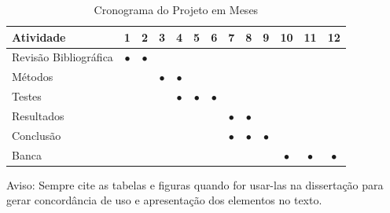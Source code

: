 \documentclass[
	12pt,				    %
	openright,			    %
	oneside,			    %
	a4paper,			    %
    sumario=tradicional,        %
	english,			    %
	brazil,				    %
 ]{abntex2}
\begin{document}
\begin{table}[htbp]
  \centering
    \caption[Cronograma Normal]{Cronograma do Projeto em Meses}
    \label{tab:cronograma1}
    \begin{tabular}{lcccccccccccc} %
    \toprule
    \textbf{Atividade} & \textbf{1} & \textbf{2} & \textbf{3} & \textbf{4} & \textbf{5} & \textbf{6} & \textbf{7} & \textbf{8} & \textbf{9} & \textbf{10} & \textbf{11} & \textbf{12} \\
    \midrule
        Revisão Bibliográfica & $\bullet$ & $\bullet$ & & & & & & & & & & \\
        Métodos & & & $\bullet$ & $\bullet$ & & & & & & & & \\
        Testes & & & & $\bullet$ & $\bullet$ & $\bullet$ & & & & & & \\
        Resultados & & & & & & & $\bullet$ & $\bullet$ & & & & \\
        Conclusão & & & & & & & $\bullet$ & $\bullet$ & $\bullet$ & & & \\
        Banca & & & & & & &&&& $\bullet$ & $\bullet$ & $\bullet$ \\
    \bottomrule
    \end{tabular}
\end{table}

Aviso: Sempre cite as tabelas e figuras quando for usar-las na dissertação para gerar concordância de uso e apresentação dos elementos no texto.

\begin{table}[htbp]
\end{table}%
\end{document}
